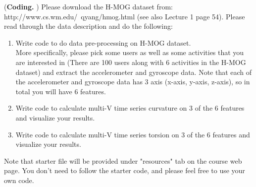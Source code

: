 \documentclass[12pt,letterpaper]{hmcpset}
\begin{document}
\begin{problem}[3]
	(\textbf{Coding. }) Please download the H-MOG dataset from: http://www.cs.wm.edu/~qyang/hmog.html (see also Lecture 1 page 54).
	 Please read through the data description and  do the following:
	 \begin{enumerate}
\item Write code to do data pre-processing on H-MOG dataset.\\ More specifically, please pick some users as well as some activities that you are interested in (There are 100 users along with 6 activities in the H-MOG dataset) and extract the accelerometer and gyroscope data. Note that each of the accelerometer and gyroscope data has 3 axis (x-axis, y-axis, z-axis), so in total you will have 6 features.
\item Write code to calculate multi-V time series curvature on 3 of the 6 features and  visualize your results.
\item Write code to calculate multi-V time series torsion on 3 of the 6 features and  visualize your results.
	 \end{enumerate}
Note that starter file will be provided under "resources" tab on the course web page. You don't need to follow the starter code, and please feel free to use your own code.
	
\end{problem}
\begin{solution}
	\vfill
\end{solution}
\newpage
\end{document}
